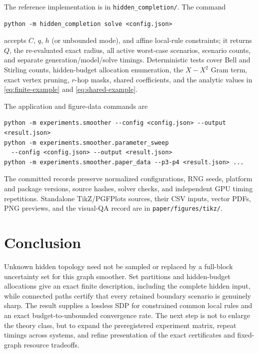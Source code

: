 \documentclass[journal,10pt]{IEEEtran}
\theoremstyle{definition}
\theoremstyle{remark}
\begin{document}
The reference implementation is in \texttt{hidden\_completion/}.  The command
\begin{verbatim}
python -m hidden_completion solve <config.json>
\end{verbatim}
accepts $C$, $q$, $h$ (or unbounded mode), and affine local-rule constraints;
it returns $Q$, the re-evaluated exact radius, all active worst-case scenarios,
scenario counts, and separate generation/model/solve timings.  Deterministic
tests cover Bell and Stirling counts, hidden-budget allocation enumeration,
the $X-X^2$ Gram term, exact vertex pruning, $r$-hop masks, shared
coefficients, and the analytic values in \eqref{eq:finite-example} and
\eqref{eq:shared-example}.

The application and figure-data commands are
\begin{verbatim}
python -m experiments.smoother --config <config.json> --output <result.json>
python -m experiments.smoother.parameter_sweep
  --config <config.json> --output <result.json>
python -m experiments.smoother.paper_data --p3-p4 <result.json> ...
\end{verbatim}
The committed records preserve normalized configurations, RNG seeds, platform
and package versions, source hashes, solver checks, and independent GPU timing
repetitions.  Standalone TikZ/PGFPlots sources, their CSV inputs, vector PDFs,
PNG previews, and the visual-QA record are in
\texttt{paper/figures/tikz/}.

\section{Conclusion}

Unknown hidden topology need not be sampled or replaced by a full-block
uncertainty set for this graph smoother.  Set partitions and hidden-budget
allocations give an exact finite description, including the complete hidden
input, while connected paths certify that every retained boundary scenario is
genuinely sharp.  The result supplies a lossless SDP for constrained common
local rules and an exact budget-to-unbounded convergence rate.  The next step
is not to enlarge the theory class, but to expand the preregistered experiment
matrix, repeat timings across systems, and refine presentation of the exact
certificates and fixed-graph resource tradeoffs.



\end{document}
